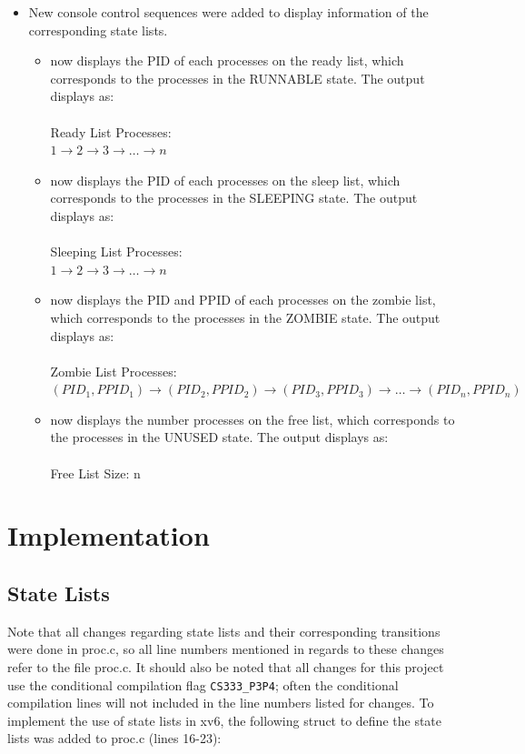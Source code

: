 \documentclass[11pt,letterpaper]{report}
\begin{document}
\begin{itemize}
	\item New console control sequences were added to display information of the corresponding state lists. 
		\begin{itemize}
			\item {} now displays the PID of each processes on the ready list, which corresponds to the processes in the RUNNABLE state. The output displays as: \\
				\\ Ready List Processes: \\ $1 \rightarrow 2 \rightarrow 3 \rightarrow \ldots \rightarrow n$
			\item {} now displays the PID of each processes on the sleep list, which corresponds to the processes in the SLEEPING state. The output displays as: \\
				\\ Sleeping List Processes: \\ $1 \rightarrow 2 \rightarrow 3 \rightarrow \ldots \rightarrow n$
			\item {} now displays the PID and PPID of each processes on the zombie list, which corresponds to the processes in the ZOMBIE state. The output displays as: \\
				\\ Zombie List Processes: \\ $(PID_1, PPID_1) \rightarrow (PID_2, PPID_2) \rightarrow (PID_3, PPID_3) \rightarrow \ldots \rightarrow (PID_n, PPID_n)$
			\item {} now displays the number processes on the free list, which corresponds to the processes in the UNUSED state. The output displays as: \\
				\\ Free List Size: n \\
		\end{itemize}
			
	\end{itemize}
	
\newpage	
	
	\section*{Implementation}
	
	
	\subsection*{State Lists}
	Note that all changes regarding state lists and their corresponding transitions were done in proc.c, so all line numbers mentioned in regards to these changes refer to the file proc.c. It should also be noted that all changes for this project use the conditional compilation flag {\tt CS333\_P3P4}; often the conditional compilation lines will not included in the line numbers listed for changes.
	To implement the use of state lists in xv6, the following struct to define the state lists was added to proc.c (lines 16-23):
	
\end{document}
